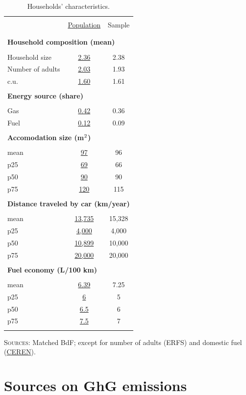 \documentclass[english,5p,authoryear]{elsarticle}
\begin{document}
\begin{appendices}
\begin{table}[!htbp]
    \caption{Households' characteristics.\label{tab:app-energetic-characs}}
\centering
\begin{tabular}{lcc}
\hline \hline  \\[-1.8ex]
 & \uline{Population} & Sample  \tabularnewline \\[-1.8ex]
\hline  \\[-1.8ex]
\multicolumn{3}{l}{\textbf{Household composition (mean)}} \tabularnewline  \\[-1.8ex]
Household size & \uline{2.36} & 2.38\tabularnewline
Number of adults & \uline{2.03} & 1.93\tabularnewline
c.u. & \uline{1.60} & 1.61\tabularnewline
\hline   \\[-1.8ex]
\multicolumn{3}{l}{\textbf{Energy source (share)}} \tabularnewline  \\[-1.8ex]
Gas & \uline{0.42} & 0.36\tabularnewline
Fuel & \uline{0.12} & 0.09\tabularnewline
\hline   \\[-1.8ex]
\multicolumn{3}{l}{\textbf{Accomodation size (m$^\textnormal{2}$)}} \tabularnewline  \\[-1.8ex]
mean & \uline{97} & 96\tabularnewline
p25 & \uline{69} & 66\tabularnewline
p50 & \uline{90} & 90\tabularnewline
p75 & \uline{120} & 115\tabularnewline
\hline   \\[-1.8ex]
\multicolumn{3}{l}{\textbf{Distance traveled by car (km/year)}} \tabularnewline  \\[-1.8ex]
mean & \uline{13,735} & 15,328\tabularnewline
p25 & \uline{4,000} & 4,000\tabularnewline
p50 & \uline{10,899} & 10,000 \tabularnewline
p75 & \uline{20,000 } & 20,000 \tabularnewline
\hline   \\[-1.8ex]
\multicolumn{3}{l}{\textbf{Fuel economy (L/100 km)}} \tabularnewline  \\[-1.8ex]
mean & \uline{6.39} & 7.25\tabularnewline
p25 & \uline{6} & 5\tabularnewline
p50 & \uline{6.5} & 6\tabularnewline
p75 & \uline{7.5} & 7\tabularnewline  \\[-1.8ex]
\hline \hline 
\end{tabular}\bigskip{}

%
     \footnotesize{\textsc{Sources:} Matched BdF; except for number of adults (ERFS) and domestic fuel (\href{https://www.lesechos.fr/industrie-services/energie-environnement/le-chauffage-au-fioul-devient-de-plus-en-plus-cher-147372}{CEREN}).}
\end{table}

\section{Sources on GhG emissions\label{app:sources}}


\end{appendices}
\end{document}
